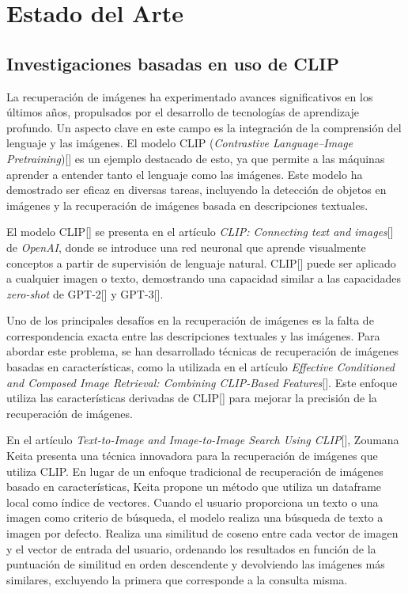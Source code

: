 \chapter{Estado del Arte}\label{chapter:state-of-the-art}


\section{Investigaciones basadas en uso de CLIP}

La recuperación de imágenes ha experimentado avances significativos en los últimos años, propulsados por el desarrollo de tecnologías de aprendizaje profundo. Un aspecto clave en este campo es la integración de la comprensión del lenguaje y las imágenes. El modelo CLIP (\textit{Contrastive Language–Image Pretraining})[\cite{clip-paper}] es un ejemplo destacado de esto, ya que permite a las máquinas aprender a entender tanto el lenguaje como las imágenes. Este modelo ha demostrado ser eficaz en diversas tareas, incluyendo la detección de objetos en imágenes y la recuperación de imágenes basada en descripciones textuales.

El modelo CLIP[\cite{clip}] se presenta en el artículo  \textit{CLIP: Connecting text and images}[\cite{clip}] de \textit{OpenAI}, donde se introduce una red neuronal que aprende visualmente conceptos a partir de supervisión de lenguaje natural. CLIP[\cite{clip}] puede ser aplicado a cualquier imagen o texto, demostrando una capacidad similar a las capacidades \textit{zero-shot} de GPT-2[\cite{gpt2}] y GPT-3[\cite{gpt3}].

Uno de los principales desafíos en la recuperación de imágenes es la falta de correspondencia exacta entre las descripciones textuales y las imágenes. Para abordar este problema, se han desarrollado técnicas de recuperación de imágenes basadas en características, como la utilizada en el artículo \textit{Effective Conditioned and Composed Image Retrieval: Combining CLIP-Based Features}[\cite{Baldrati2022}]. Este enfoque utiliza las características derivadas de CLIP[\cite{clip}] para mejorar la precisión de la recuperación de imágenes.

En el artículo \textit{Text-to-Image and Image-to-Image Search Using CLIP}[\cite{keita2023clip}], Zoumana Keita presenta una técnica innovadora para la recuperación de imágenes que utiliza CLIP. En lugar de un enfoque tradicional de recuperación de imágenes basado en características, Keita propone un método que utiliza un dataframe local como índice de vectores. Cuando el usuario proporciona un texto o una imagen como criterio de búsqueda, el modelo realiza una búsqueda de texto a imagen por defecto. Realiza una similitud de coseno entre cada vector de imagen y el vector de entrada del usuario, ordenando los resultados en función de la puntuación de similitud en orden descendente y devolviendo las imágenes más similares, excluyendo la primera que corresponde a la consulta misma.

